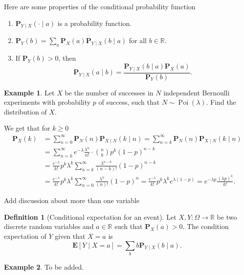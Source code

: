 \documentclass[11pt,a4paper]{article}
\theoremstyle{definition}
\newtheorem{definition}{Definition}[section]
\newtheorem{example}{Example}[section]
\theoremstyle{plain}
\DeclareMathOperator{\Poi}{Poi}
\newcommand{\R}{\mathbb{R}}
\newcommand{\E}{\mathbf{E}}
\newcommand{\Prob}{\mathbf{P}}
\begin{document}
  Here are some properties of the conditional probability function
  \begin{enumerate}
    \item $\Prob_{Y \mid X}(\cdot \mid a)$ is a probability function.
    \item $\Prob_Y(b) = \sum_{a} \Prob_X(a) \Prob_{Y \mid X}(b \mid a)$
      for all $b \in \R$.
    \item If $\Prob_Y(b) > 0$, then
    \[
      \Prob_{Y \mid X}(a \mid b) =
      \frac{\Prob_{Y \mid X}(b \mid a) \Prob_X(a)}{\Prob_Y(b)}.
    \]
  \end{enumerate}
  
  \begin{example}
    Let $X$ be the number of successes in $N$ independent Bernoulli experiments
    with probability $p$ of success, such that $N \sim \Poi(\lambda)$.
    Find the distribution of $X$.

    We get that for $k \geq 0$
    \begin{align*}
      \Prob_X(k) &= \sum_{n=0}^{\infty} \Prob_N(n) \Prob_{X \mid N}(k \mid n) =
      \sum_{n=k}^{\infty} \Prob_N(n) \Prob_{X \mid N}(k \mid n) \\
      &= \sum_{n=k}^{\infty} e^{-\lambda} \frac{\lambda^n}{n!} \cdot
        \binom{n}{k} p^k (1-p)^{n-k} \\
      &= \frac{e^{-\lambda}}{k!} p^k \lambda^k 
        \sum_{n=k}^{\infty} \frac{\lambda^{n-k}}{(n-k)!}(1-p)^{n-k} \\
      &= \frac{e^{-\lambda}}{k!} p^k \lambda^k 
        \sum_{n=0}^{\infty} \frac{\lambda^{n}}{(n)!}(1-p)^{n}
      = \frac{e^{-\lambda}}{k!} p^k \lambda^k e^{\lambda(1-p)}
      = e^{-\lambda p} \frac{(\lambda p)^{k}}{k!}.
    \end{align*}
  \end{example}

  Add discussion about more than one variable

  \begin{definition}[Conditional expectation for an event]
    Let $X,Y \colon \Omega \to \R$ be two discrete random variables and
    $a \in \R$ such that $\Prob_X(a) > 0$. The condition expectation of
    $Y$ given that $X = a$ is
    \[
      \E[Y \mid X = a] = \sum_{b} b \Prob_{Y \mid X}(b \mid a).
    \]
  \end{definition}

  \begin{example}
    To be added.
  \end{example}
\end{document}
